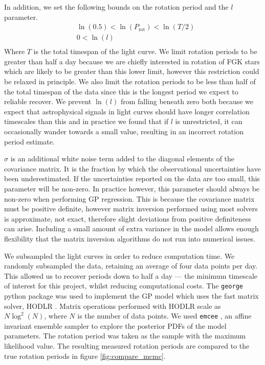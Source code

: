 \documentclass[useAMS, usenatbib, preprint, 12pt]{aastex}
\begin{document}
In addition, we set the following bounds on the rotation period and the $l$
parameter.
\begin{eqnarray}
 	&	\ln(0.5) < \ln(P_{\mathrm{rot}}) < \ln(T/2) \\ \nonumber
    &   0 < \ln(l) \\
\end{eqnarray}
\label{eq:priors}
Where $T$ is the total timespan of the light curve.
We limit rotation periods to be greater than half a day because we are chiefly
interested in rotation of FGK stars which are likely to be greater than this
lower limit, however this restriction could be relaxed in principle.
We also limit the rotation periods to be less than half of the total timespan
of the data since this is the longest period we expect to reliable recover.
We prevent $\ln(l)$ from falling beneath zero both because we expect that
astrophysical signals in light curves should have longer correlation
timescales than this and in practice we found that if $l$ is unrestricted, it
can occasionally wander towards a small value, resulting in an incorrect
rotation period estimate.

$\sigma$ is an additional white noise term added to the diagonal elements of
the covariance matrix. It is the fraction by which the observational
uncertainties have been underestimated.
If the uncertainties reported on the data are too small, this parameter will
be non-zero.
In practice however, this parameter should always be non-zero when performing
GP regression.
This is because the covariance matrix must be positive definite, however
matrix inversion performed using most solvers is approximate, not exact,
therefore slight deviations from positive definiteness can arise.
Including a small amount of extra variance in the model allows enough
flexibility that the matrix inversion algorithms do not run into numerical
issues.

We subsampled the light curves in order to reduce computation time.
We randomly subsampled the data, retaining an average of four data points per
day.
This allowed us to recover periods down to half a day --- the minimum
timescale of interest for this project, whilst reducing computational costs.
The {\tt george} \citep{George} python package was used to implement the GP
model which uses the fast matrix solver, HODLR \citep{Ambikasaran2014}.
Matrix operations performed with HODLR scale as $N \log ^2 (N)$, where $N$ is
the number of data points.
We used {\tt emcee} \citep{Foreman-Mackey2013}, an affine invariant ensemble
sampler to explore the posterior PDFs of the model parameters.
The rotation period was taken as the sample with the maximum likelihood value.
The resulting measured rotation periods are compared to the true rotation
periods in figure \ref{fig:compare_mcmc}.
\end{document}
